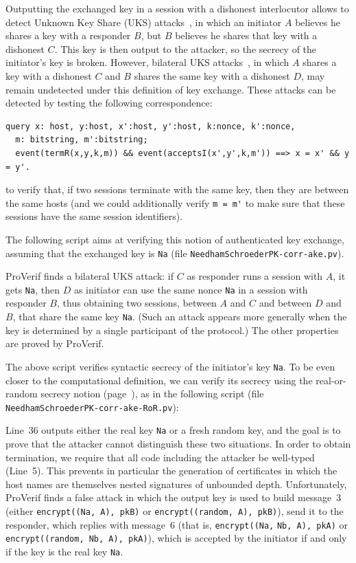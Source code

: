 \documentclass{book}
\begin{document}
Outputting the exchanged key in a session with a dishonest
interlocutor allows to detect Unknown Key Share (UKS) attacks~\cite{Diffie92},
in which an initiator $A$ believes he shares a key with a responder
$B$, but $B$ believes he shares that key with a dishonest $C$. This
key is then output to the attacker, so the secrecy of the initiator's
key is broken. However, bilateral UKS attacks~\cite{Chen08}, in which
$A$ shares a key with a dishonest $C$ and $B$ shares the same key with
a dishonest $D$, may remain undetected under this definition of key exchange.
These attacks can be detected by testing the following correspondence:
\begin{lstlisting}[numbers=none]
query x: host, y:host, x':host, y':host, k:nonce, k':nonce,
  m: bitstring, m':bitstring;
  event(termR(x,y,k,m)) && event(acceptsI(x',y',k,m')) ==> x = x' && y = y'.
\end{lstlisting}
to verify that, if two sessions terminate with the same key, then they are between the same hosts (and we could additionally verify \lstinline!m = m'! to make sure that these sessions have the same session identifiers).

The following script aims at verifying this notion of authenticated
key exchange, assuming that the exchanged key is \lstinline!Na! (file
{\tt {\docexdir}NeedhamSchroederPK-corr-ake.pv}).
%

%
ProVerif finds a bilateral UKS attack: if $C$ as responder runs a
session with $A$, it gets \lstinline!Na!, then $D$ as initiator can
use the same nonce \lstinline!Na! in a session with responder $B$,
thus obtaining two sessions, between $A$ and $C$ and between $D$ and
$B$, that share the same key \lstinline!Na!. (Such an attack appears
more generally when the key is determined by a single participant of the
protocol.) The other properties are proved by ProVerif.

The above script verifies syntactic secrecy of the initiator's key
\lstinline!Na!.  To be even closer to the computational definition, we
can verify its secrecy using the real-or-random secrecy notion
(page~\pageref{page:realorrandom}), as in the following script
(file {\tt {\docexdir}NeedhamSchroederPK-corr-ake-RoR.pv}):
%

%
Line~36 outputs either the real key \lstinline!Na! or a fresh random
key, and the goal is to prove that the attacker cannot distinguish
these two situations.  In order to obtain termination, we require that
all code including the attacker be well-typed (Line~5).
This prevents in particular the generation of certificates in which
the host names are themselves nested signatures of unbounded depth.
%
Unfortunately, ProVerif finds a false attack in which the output key
is used to build message~3 (either \lstinline!encrypt((Na, A), pkB)!
or \lstinline!encrypt((random, A), pkB)!), send it to the responder,
which replies with message~6 (that is, \lstinline!encrypt((Na,!
\lstinline!Nb, A), pkA)! or
\lstinline!encrypt((random, Nb, A), pkA)!), which is accepted by the
initiator if and only if the key is the real key \lstinline!Na!.
\end{document}
